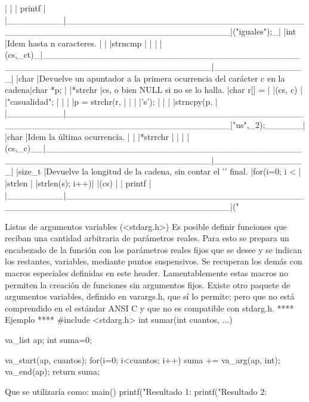 |         |                                                                          |    printf     |
|_________|__________________________________________________________________________|("iguales\n");_|
|int      |Idem hasta n caracteres.                                                  |               |
|strncmp  |                                                                          |               |
|(cs,_ct)_|__________________________________________________________________________|_______________|
|char     |Devuelve un apuntador a la primera ocurrencia del carácter c en la cadena|char *p;       |
|*strchr  |cs, o bien NULL si no se lo halla.                                        |char r[] =     |
|(cs, c)  |                                                                          |"casualidad";  |
|         |                                                                          |p = strchr(r,  |
|         |                                                                          |'s');          |
|         |                                                                          |strncpy(p,     |
|_________|__________________________________________________________________________|"us",_2);______|
|char     |Idem la última ocurrencia.                                               |               |
|*strrchr |                                                                          |               |
|(cs,_c)__|__________________________________________________________________________|_______________|
|size_t   |Devuelve la longitud de la cadena, sin contar el '\0' final.              |for(i=0; i <   |
|strlen   |                                                                          |strlen(s); i++)|
|(cs)     |                                                                          |    printf     |
|_________|__________________________________________________________________________|("%

Listas de argumentos variables (<stdarg.h>)
Es posible definir funciones que reciban una cantidad arbitraria de parámetros
reales. Para esto se prepara un encabezado de la función con los parámetros
reales fijos que se desee y se indican los restantes, variables, mediante
puntos suspensivos. Se recuperan los demás con macros especiales definidas en
este header.
Lamentablemente estas macros no permiten la creación de funciones sin
argumentos fijos. Existe otro paquete de argumentos variables, definido en
varargs.h, que sí lo permite; pero que no está comprendido en el estándar ANSI
C y que no es compatible con stdarg.h.
**** Ejemplo ****
    #include <stdarg.h>
    int sumar(int cuantos, ...)
    {
        va_list ap;
        int suma=0;

        va_start(ap, cuantos);
        for(i=0; i<cuantos; i++)
            suma += va_arg(ap, int);
        va_end(ap);
        return suma;
   }
Que se utilizaría como:
    main()
    {
        printf("Resultado 1: %
        printf("Resultado 2: %
    }

